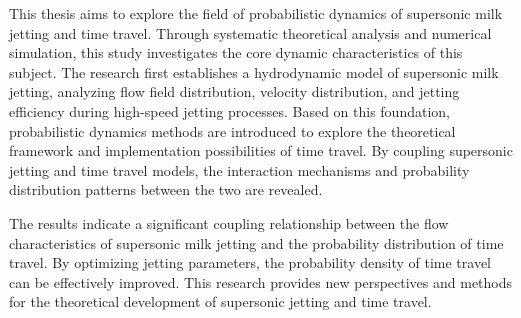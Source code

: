 \begin{abstract}

本文旨在探索超音速牛奶喷射与时间旅行的概率动力学这一领域的研究。通过系统的理论分析和数值模拟，本文深入研究了这一课题的核心动力学特性。研究首先建立了超音速牛奶喷射的流体动力学模型，分析了高速喷射过程中的流场分布、速度分布和喷射效率。在此基础上，引入概率动力学方法，探讨了时间旅行的理论框架和实现可能性。通过耦合超音速喷射与时间旅行模型，揭示了二者之间的相互作用机制和概率分布规律。

研究结果表明，超音速牛奶喷射的流场特性与时间旅行的概率分布存在显著耦合关系。通过优化喷射参数，可以有效提高时间旅行的概率密度。本研究为超音速喷射和时间旅行领域的理论发展提供了新的视角和方法。


\end{abstract}



\begin{englishabstract}

This thesis aims to explore the field of probabilistic dynamics of supersonic milk jetting and time travel. Through systematic theoretical analysis and numerical simulation, this study investigates the core dynamic characteristics of this subject. The research first establishes a hydrodynamic model of supersonic milk jetting, analyzing flow field distribution, velocity distribution, and jetting efficiency during high-speed jetting processes. Based on this foundation, probabilistic dynamics methods are introduced to explore the theoretical framework and implementation possibilities of time travel. By coupling supersonic jetting and time travel models, the interaction mechanisms and probability distribution patterns between the two are revealed.

The results indicate a significant coupling relationship between the flow characteristics of supersonic milk jetting and the probability distribution of time travel. By optimizing jetting parameters, the probability density of time travel can be effectively improved. This research provides new perspectives and methods for the theoretical development of supersonic jetting and time travel.


\end{englishabstract}
